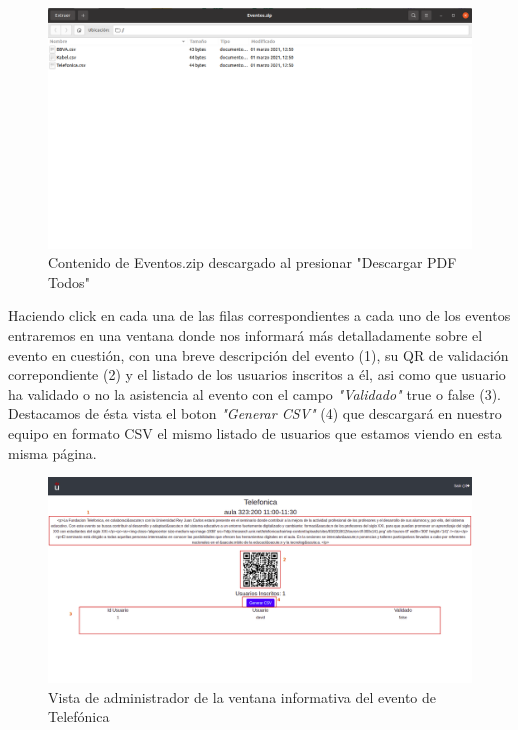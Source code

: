 \documentclass[a4paper, 12pt]{book}
\begin{document}
\begin{enumerate}
	\begin{figure}[H]
  	\centering
  	\includegraphics[width=16cm, keepaspectratio]{img/AdminEventosZip.png}
  	\caption{Contenido de Eventos.zip descargado al presionar "Descargar PDF Todos"}\label{fig:AdminEventosZip}
	\end{figure}
	
	 
	Haciendo click en cada una de las filas correspondientes a cada uno de los eventos entraremos en una ventana donde nos informará más detalladamente sobre el evento en cuestión, con una breve descripción del evento (1), su QR de validación correpondiente (2) y el listado de los usuarios inscritos a él, asi como que usuario ha validado o no la asistencia al evento con el campo \textit{"Validado"} true o false (3). Destacamos de ésta vista el boton \textit{"Generar CSV"} (4) que descargará en nuestro equipo en formato CSV el mismo listado de usuarios que estamos viendo en esta misma página.
	
	\begin{figure}[H]
  	\centering
  	\includegraphics[width=16cm, keepaspectratio]{img/adminListaEventoTelefonica.png}
  	\caption{Vista de administrador de la ventana informativa del evento de Telefónica}\label{fig:adminListaEventoTelefonica}
	\end{figure}



\end{enumerate}
\end{document}
